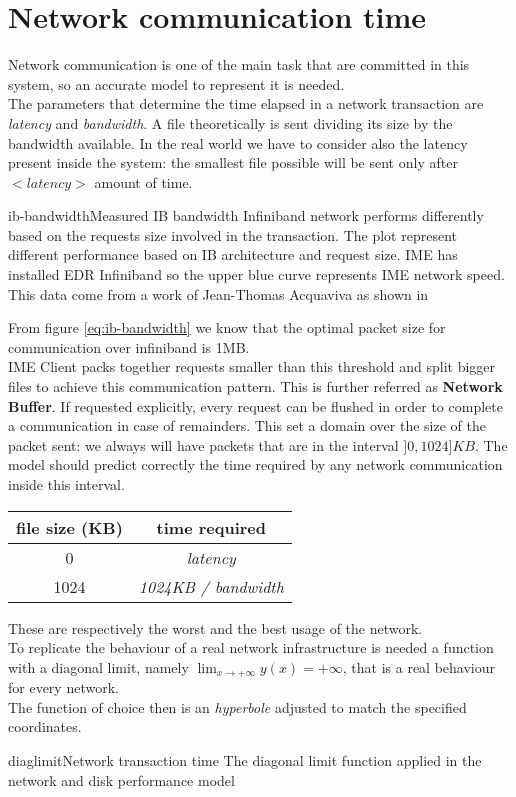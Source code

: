 \section{Network communication time}\label{netbuff}
Network communication is one of the main task that are committed in this system,
so an accurate model to represent it is needed. \\
The parameters that determine the time elapsed in a network transaction are
\textit{latency} and \textit{bandwidth}. A file theoretically is sent dividing
its size by the bandwidth available. In the real world we have to consider also
the latency present inside the system: the smallest file possible will be sent
only after $<latency>$ amount of time. \\
\begin{myimage}{ib-bandwidth}{Measured IB bandwidth}
    Infiniband network performs differently based on the requests size involved
    in the transaction. The plot represent different performance based on IB
    architecture and request size. IME has installed EDR Infiniband so the upper
    blue curve represents IME network speed. This data come from a work of
    Jean-Thomas Acquaviva as shown in \cite{erasurecoding-pdf}
\end{myimage}

From figure \ref{eq:ib-bandwidth} we know that the optimal packet size for
communication over infiniband is 1MB. \\
IME Client packs together requests smaller than this threshold and split bigger
files to achieve this communication pattern. This is further referred as
\textbf{Network Buffer}.  If requested explicitly, every request can be flushed
in order to complete a communication in case of remainders.  This set a domain
over the size of the packet sent: we always will have packets that are in the
interval $]0, 1024] KB$. The model should predict correctly the time required by
any network communication inside this interval. \\

\vspace{0.5cm}
\begin{tabular}{c | c}
    file size (KB) & time required \\ \hline
    0 & \textit{latency} \\ \hline
    1024 & \textit{1024KB / bandwidth}
\end{tabular}
\vspace{0.5cm}

These are respectively the worst and the best usage of the network. \\
To replicate the behaviour of a real network infrastructure is needed a function
with a diagonal limit, namely $\lim_{x \to +\infty} y(x) = +\infty$,
that is a real behaviour for every network. \\
The function of choice then is an \textit{hyperbole} adjusted to match the
specified coordinates. \\
\begin{myimage}{diaglimit}{Network transaction time}
    The diagonal limit function applied in the network and disk performance model
\end{myimage}


